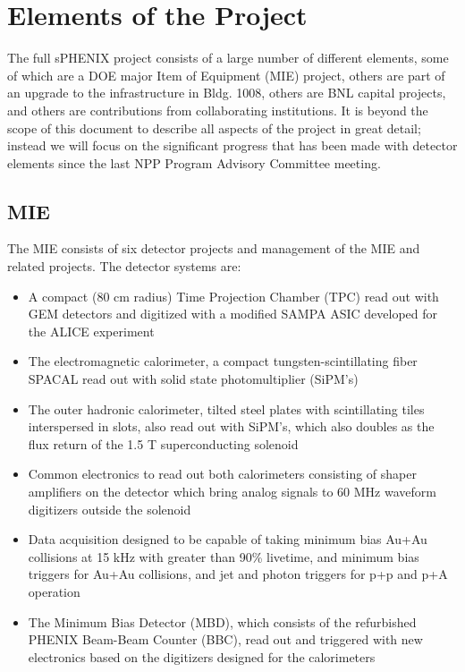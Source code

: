 \section{Elements of the Project}
\label{sec:elements}

The full sPHENIX project consists of a large number of different
elements, some of which are a DOE major Item of Equipment (MIE) project,
others are part of an
upgrade to the infrastructure in Bldg. 1008, others are BNL capital
projects, and others are contributions from collaborating
institutions.  It is beyond the scope of this document to describe all
aspects of the project in great detail; instead we will focus on
the significant progress that has been made with detector elements
since the last NPP Program Advisory Committee meeting.

\subsection{MIE}

The MIE consists of six detector projects and management of the
MIE and related projects.
The detector systems are:

\begin{itemize}
    \item A compact (80 cm radius) Time Projection Chamber (TPC) read out with GEM detectors and digitized with a modified SAMPA ASIC developed for the ALICE experiment
    \item The electromagnetic calorimeter, a compact tungsten-scintillating fiber
    SPACAL read out with solid state photomultiplier (SiPM's)
    \item The outer hadronic calorimeter, tilted steel plates with scintillating tiles
    interspersed in slots, also read out with SiPM's, which also doubles
    as the flux return of the 1.5 T superconducting solenoid
    \item Common electronics to read out both calorimeters consisting of
    shaper amplifiers on the detector which bring analog signals to 60 MHz waveform digitizers outside the solenoid
    \item Data acquisition designed to be capable of taking minimum bias
    Au+Au collisions at 15 kHz with greater than 90\% livetime, and minimum bias triggers for Au+Au collisions, and jet and photon triggers for p+p and p+A operation
    \item The Minimum Bias Detector (MBD), which consists of the refurbished PHENIX Beam-Beam Counter (BBC), read out and triggered with new electronics based on the digitizers designed for the calorimeters
\end{itemize}

